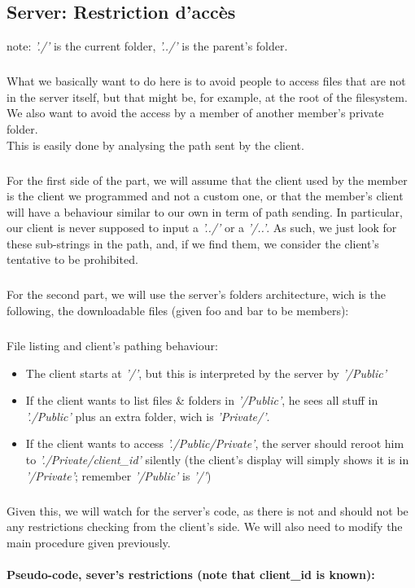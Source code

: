 \documentclass[12pt,a4paper,twoside]{article}
\begin{document}
		\subsection{Server: Restriction d'accès} %
			note: \textit{'./'} is the current folder, \textit{'../'} is the parent's folder.
			\subparagraph*{}
				What we basically want to do here is to avoid people to access files that are not in the server itself, but that might be, for example, at the root of the filesystem. We also want to avoid the access by a member of another member's private folder.\\
				This is easily done by analysing the path sent by the client.
			\subparagraph*{}
				For the first side of the part, we will assume that the client used by the member is the client we programmed and not a custom one, or that the member's client will have a behaviour similar to our own in term of path sending. In particular, our client is never supposed to input a \textit{'../'} or a \textit{'/..'}. As such, we just look for these sub-strings in the path, and, if we find them, we consider the client's tentative to be prohibited.
			\subparagraph*{}
				For the second part, we will use the server's folders architecture, wich is the following, the downloadable files (given foo and bar to be members):
				\begin{samepage}
					
				\end{samepage}
			\subparagraph*{}
				File listing and client's pathing behaviour:
				\begin{itemize}
					\item{} The client starts at \textit{'/'}, but this is interpreted by the server by \textit{'/Public'}
					\item{} If the client wants to list files \& folders in \textit{'/Public'}, he sees all stuff in \textit{'./Public'} plus an extra folder, wich is \textit{'Private/'}.
					\item{} If the client wants to access \textit{'./Public/Private'}, the server should reroot him to \textit{'./Private/client\_id'} silently (the client's display will simply shows it is in \textit{'/Private'}; remember \textit{'/Public'} is \textit{'/'})
				 \end{itemize}
			\subparagraph*{}
				Given this, we will watch for the server's code, as there is not and should not be any restrictions checking from the client's side. We will also need to modify the main procedure given previously.
			\paragraph*{Pseudo-code, sever's restrictions (note that client\_id is known):}
				
				
\end{document}
